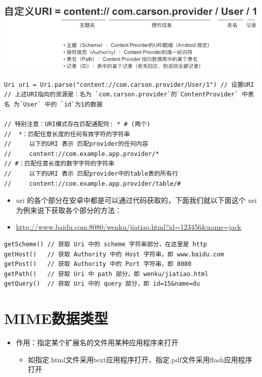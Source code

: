 \documentclass[9pt, b5paaper]{book}
\begin{document}
\includegraphics[width=.9\linewidth]{./pic/uri.png}
\begin{verbatim}
Uri uri = Uri.parse("content://com.carson.provider/User/1") // 设置URI
// 上述URI指向的资源是：名为 `com.carson.provider`的`ContentProvider` 中表名 为`User` 中的 `id`为1的数据

// 特别注意：URI模式存在匹配通配符: * # (两个)
//  *：匹配任意长度的任何有效字符的字符串
//     以下的URI 表示 匹配provider的任何内容
//     content://com.example.app.provider/* 
// #：匹配任意长度的数字字符的字符串
//     以下的URI 表示 匹配provider中的table表的所有行
//     content://com.example.app.provider/table/#
\end{verbatim}
\begin{itemize}
\item uri 的各个部分在安卓中都是可以通过代码获取的，下面我们就以下面这个 uri 为例来说下获取各个部分的方法：
\item \url{http://www.baidu.com:8080/wenku/jiatiao.html?id=123456&name=jack}
\end{itemize}
\begin{verbatim}
getScheme() // 获取 Uri 中的 scheme 字符串部分，在这里是 http
getHost()   // 获取 Authority 中的 Host 字符串，即 www.baidu.com
getPost()   // 获取 Authority 中的 Port 字符串，即 8080
getPath()   // 获取 Uri 中 path 部分，即 wenku/jiatiao.html
getQuery()  // 获取 Uri 中的 query 部分，即 id=15&name=du
\end{verbatim}

\section{MIME数据类型}
\label{sec-5-2}
\begin{itemize}
\item 作用：指定某个扩展名的文件用某种应用程序来打开
\begin{itemize}
\item 如指定.html文件采用text应用程序打开、指定.pdf文件采用flash应用程序打开
\end{itemize}
\end{itemize}
\end{document}
